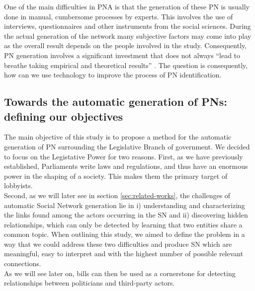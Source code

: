 One of the main difficulties in PNA is that the generation of these PN is usually done in manual, cumbersome processes by experts. This involves the use of interviews, questionnaires and other instruments from the social sciences. During the actual generation of the network many subjective factors may come into play as the overall result depends on the people involved in the study. Consequently, PN generation involves a significant investment that does not always ``lead to breathe taking empirical and theoretical results'' \cite{kenis1991policy}. The question is consequently, how can we use technology to improve the process of PN identification. 

\subsection{Towards the automatic generation of PNs: defining our objectives}\label{subsec:objectives}

The main objective of this study is to propose a method for the automatic generation of PN surrounding the Legislative Branch of government. We decided to focus on the Legistative Power for two reasons. First, as we have previously established, Parliaments write laws and regulations, and thus have an enormous power in the shaping of a society. This makes them the primary target of lobbyists. \\ 

Second, as we will later see in section \ref{sec:related-works}, the challenges of automatic Social Network generation lie in i) understanding and characterizing the links found among the actors occurring in the SN and ii) discovering hidden relationships, which can only be detected by learning that two entities share a common topic.  When outlining this study, we aimed to define the problem in a way that we could address these two difficulties and produce SN which are meaningful, easy to interpret and with the highest number of possible relevant connections. \\

As we will see later on, bills can then be used as a cornerstone for detecting relationships between politicians and third-party actors. \\%

